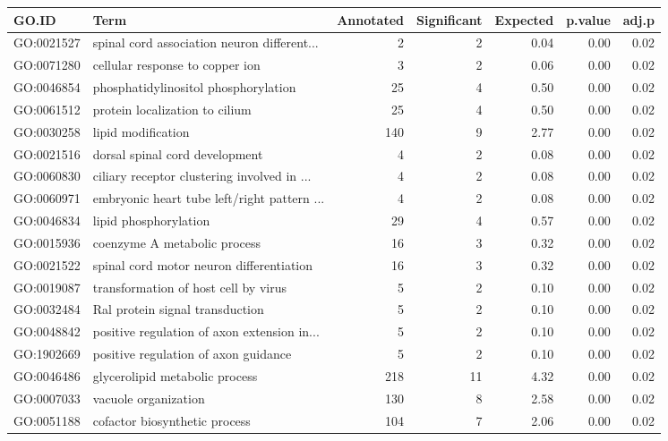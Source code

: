 \begin{table}[ht]
\centering
\begin{tabular}{llrrrrr}
  \hline
GO.ID & Term & Annotated & Significant & Expected & p.value & adj.p \\ 
  \hline
GO:0021527 & spinal cord association neuron different... &   2 &   2 & 0.04 & 0.00 & 0.02 \\ 
  GO:0071280 & cellular response to copper ion &   3 &   2 & 0.06 & 0.00 & 0.02 \\ 
  GO:0046854 & phosphatidylinositol phosphorylation &  25 &   4 & 0.50 & 0.00 & 0.02 \\ 
  GO:0061512 & protein localization to cilium &  25 &   4 & 0.50 & 0.00 & 0.02 \\ 
  GO:0030258 & lipid modification & 140 &   9 & 2.77 & 0.00 & 0.02 \\ 
  GO:0021516 & dorsal spinal cord development &   4 &   2 & 0.08 & 0.00 & 0.02 \\ 
  GO:0060830 & ciliary receptor clustering involved in ... &   4 &   2 & 0.08 & 0.00 & 0.02 \\ 
  GO:0060971 & embryonic heart tube left/right pattern ... &   4 &   2 & 0.08 & 0.00 & 0.02 \\ 
  GO:0046834 & lipid phosphorylation &  29 &   4 & 0.57 & 0.00 & 0.02 \\ 
  GO:0015936 & coenzyme A metabolic process &  16 &   3 & 0.32 & 0.00 & 0.02 \\ 
  GO:0021522 & spinal cord motor neuron differentiation &  16 &   3 & 0.32 & 0.00 & 0.02 \\ 
  GO:0019087 & transformation of host cell by virus &   5 &   2 & 0.10 & 0.00 & 0.02 \\ 
  GO:0032484 & Ral protein signal transduction &   5 &   2 & 0.10 & 0.00 & 0.02 \\ 
  GO:0048842 & positive regulation of axon extension in... &   5 &   2 & 0.10 & 0.00 & 0.02 \\ 
  GO:1902669 & positive regulation of axon guidance &   5 &   2 & 0.10 & 0.00 & 0.02 \\ 
  GO:0046486 & glycerolipid metabolic process & 218 &  11 & 4.32 & 0.00 & 0.02 \\ 
  GO:0007033 & vacuole organization & 130 &   8 & 2.58 & 0.00 & 0.02 \\ 
  GO:0051188 & cofactor biosynthetic process & 104 &   7 & 2.06 & 0.00 & 0.02 \\ 

\end{tabular}
\end{table}
